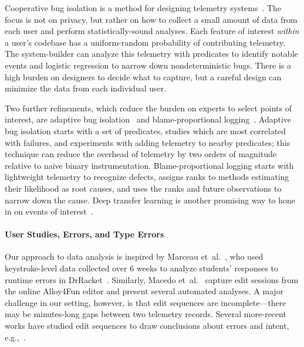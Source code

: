\documentclass[english,submission,cleveref]{programming}
\begin{document}
Cooperative bug isolation is a method for designing
telemetry systems~\cite{liblit-thesis}.
The focus is not on privacy, but rather on how to collect a small amount of
data from each user and perform statistically-sound analyses.
Each feature of interest \emph{within} a user's codebase has a uniform-random
probability of contributing telemetry.
The system-builder can analyze this telemetry with predicates to identify
notable events and logistic regression to narrow down nondeterministic bugs.
There is a high burden on designers to decide what to capture,
but a careful design can minimize the data from each individual user.

Two further refinements, which reduce the burden on experts to
select points of interest, are adaptive bug isolation~\cite{nl-icse-2010}
and blame-proportional logging~\cite{lnsmc-usenix-2018}.
Adaptive bug isolation starts with a set of predicates, studies which are
most correlated with failures, and experiments with adding telemetry to nearby
predicates; this technique can reduce the overhead of telemetry by two orders
of magnitude relative to naive binary instrumentation.
Blame-proportional logging starts with lightweight telemetry to recognize
defects, assigns ranks to methods estimating their likelihood as root causes,
and uses the ranks and future observations to narrow down the cause.
Deep transfer learning is another promising way to hone in on events of
interest~\cite{zfstt-ieeesensors-2022}.




\paragraph{User Studies, Errors, and Type Errors}

Our approach to data analysis is inspired by Marceau
et~al.~\cite{mfk-onward-2011,mfk-sigcse-2011}, who used keystroke-level data
collected over 6 weeks to analyze students' responses to runtime errors
in DrRacket~\cite{fcffksf-jfp-2002}.
Similarly, Macedo et~al.~\cite{mcpcsprs-abz-2020,mcpcsprs-scp-2021} capture
edit sessions from the online Alloy4Fun editor and present several automated
analyses.
A major challenge in our setting, however, is that edit sequences are
incomplete---there may be minutes-long gaps between two telemetry records.
Several more-recent works have studied edit sequences
to draw conclusions about errors and intent, e.g.,~\cite{wk-koli-2020,lgk-pj-2022,rsgl-cpp-2020}.
\end{document}
